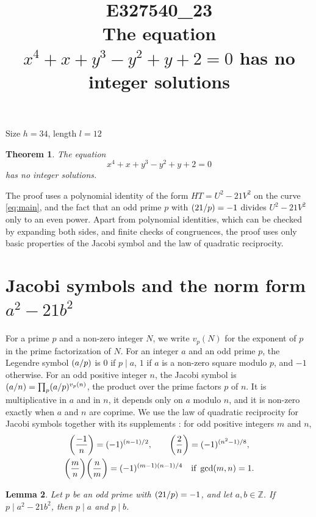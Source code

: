 \documentclass[11pt]{article}
\title{\textbf{E327540\_23}\\[4pt] {\Large The equation $x^{4}+x+y^{3}-y^{2}+y+2=0$ has no integer solutions}}
\author{}
\date{}
\newtheorem{theorem}{Theorem}
\newtheorem{lemma}[theorem]{Lemma}
\newcommand{\Z}{\mathbb{Z}}
\newcommand{\leg}[2]{\mathchoice{\biggl(\dfrac{#1}{#2}\biggr)}{(#1/#2)}{(#1/#2)}{(#1/#2)}}
\begin{document}
\maketitle
\vspace{-8ex}
\begin{center}
Size $h=34$, length $l=12$
\end{center}

\begin{theorem}\label{thm:main}
The equation
\begin{equation}\label{eq:main}
x^{4}+x+y^{3}-y^{2}+y+2=0
\end{equation}
has no integer solutions.
\end{theorem}

The proof uses a polynomial identity of the form $HT=U^2-21V^2$ on the curve \eqref{eq:main}, and the fact that an odd prime $p$ with $\leg{21}{p}=-1$ divides $U^2-21V^2$ only to an even power. Apart from polynomial identities, which can be checked by expanding both sides, and finite checks of congruences, the proof uses only basic properties of the Jacobi symbol and the law of quadratic reciprocity.

\section{\texorpdfstring{Jacobi symbols and the norm form $a^2-21b^2$}{Jacobi symbols and the norm form}}

For a prime $p$ and a non-zero integer $N$, we write $v_p(N)$ for the exponent of $p$ in the prime factorization of $N$. For an integer $a$ and an odd prime $p$, the Legendre symbol $\leg{a}{p}$ is $0$ if $p\mid a$, $1$ if $a$ is a non-zero square modulo $p$, and $-1$ otherwise. For an odd positive integer $n$, the Jacobi symbol is $\leg{a}{n}=\prod_p\leg{a}{p}^{v_p(n)}$, the product over the prime factors $p$ of $n$. It is multiplicative in $a$ and in $n$, it depends only on $a$ modulo $n$, and it is non-zero exactly when $a$ and $n$ are coprime. We use the law of quadratic reciprocity for Jacobi symbols together with its supplements \cite[Chapter~5, \S2]{IR}: for odd positive integers $m$ and $n$,
\begin{gather*}
\leg{-1}{n}=(-1)^{(n-1)/2},\qquad\leg{2}{n}=(-1)^{(n^2-1)/8},\\
\leg{m}{n}\leg{n}{m}=(-1)^{(m-1)(n-1)/4}\quad\text{if }\gcd(m,n)=1.
\end{gather*}

\begin{lemma}\label{lem:divides}
Let $p$ be an odd prime with $\leg{21}{p}=-1$, and let $a,b\in\Z$. If $p\mid a^2-21b^2$, then $p\mid a$ and $p\mid b$.
\end{lemma}
\end{document}
